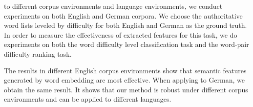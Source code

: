 to different corpus environments and language environments,
we conduct experiments on both English and German corpora.
We choose the authoritative word lists leveled by difficulty for both 
English and German as the ground truth.
In order to measure the effectiveness of extracted features for this task, we do experiments on both the word difficulty level classification task and the word-pair difficulty ranking task.

The results in different English corpus environments 
show that semantic features generated by word embedding are most effective.
When applying to German, we obtain the same result.
It shows that our method is robust under different corpus environments 
and can be applied to different languages. 


